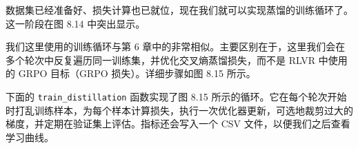 数据集已经准备好、损失计算也已就位，现在我们就可以实现蒸馏的训练循环了。这一阶段在图 8.14 中突出显示。


我们这里使用的训练循环与第 6 章中的非常相似。主要区别在于，这里我们会在多个轮次中反复遍历同一训练集，并优化交叉熵蒸馏损失，而不是 RLVR 中使用的 GRPO 目标（GRPO 损失）。详细步骤如图 8.15 所示。


下面的 \texttt{train\_distillation} 函数实现了图 8.15 所示的循环。它在每个轮次开始时打乱训练样本，为每个样本计算损失，执行一次优化器更新，可选地裁剪过大的梯度，并定期在验证集上评估。指标还会写入一个 CSV 文件，以便我们之后查看学习曲线。

